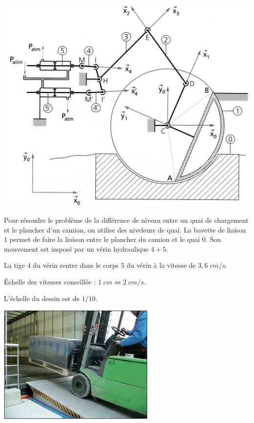 \vfill

\begin{center}
\includegraphics[width=.9\textwidth]{png/img22}
\end{center}
\newpage

\begin{minipage}[c]{.45\linewidth}
Pour résoudre le problème de la différence de niveau entre un quai de chargement et le plancher d'un camion, on utilise des niveleurs de quai.
La bavette de liaison $1$ permet de faire la liaison entre le plancher du 
camion  et le quai $0$. Son mouvement est imposé par un vérin hydraulique $4+5$.

La tige  $4$  du vérin rentre dans le corps $5$ du vérin  à la vitesse de $3,6\;cm/s$.

Échelle des vitesses conseillée : $1\;cm \Longleftrightarrow 2\;cm/s$.

L’échelle du dessin est de $1/10$.

\end{minipage}\hfill
\begin{minipage}[c]{.45\linewidth}

\begin{center}
\includegraphics[width=.8\textwidth]{png/fig1-niveleur}
\end{center}
\end{minipage}

